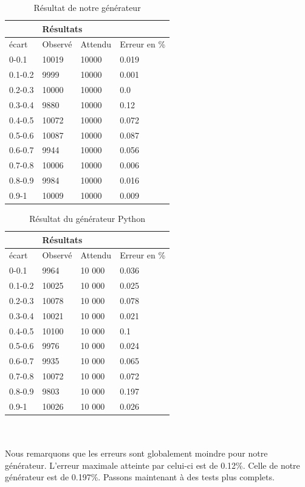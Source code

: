 \documentclass[french]{article}
\begin{document}
\begin{table}[]
\centering
\caption{Résultat de notre générateur }

\begin{tabular}{|l|l|l|l|}
\hline
        & \multicolumn{3}{l|}{Résultats}   \\ \hline
écart   & Observé & Attendu & Erreur en \% \\ \hline
0-0.1   & 10019   & 10000   & 0.019        \\ \hline
0.1-0.2 & 9999    & 10000   & 0.001        \\ \hline
0.2-0.3 & 10000   & 10000   & 0.0          \\ \hline
0.3-0.4 & 9880    & 10000   & 0.12         \\ \hline
0.4-0.5 & 10072   & 10000   & 0.072        \\ \hline
0.5-0.6 & 10087   & 10000   & 0.087        \\ \hline
0.6-0.7 & 9944    & 10000   & 0.056        \\ \hline
0.7-0.8 & 10006   & 10000   & 0.006        \\ \hline
0.8-0.9 & 9984    & 10000   & 0.016        \\ \hline
0.9-1   & 10009   & 10000   & 0.009        \\ \hline
\end{tabular}
\end{table}
\begin{table}[]
\centering
\caption{Résultat du générateur Python}

\begin{tabular}{|l|l|l|l|}
\hline
        & \multicolumn{3}{l|}{Résultats}   \\ \hline
écart   & Observé & Attendu & Erreur en \% \\ \hline
0-0.1   & 9964    & 10 000   & 0.036        \\ \hline
0.1-0.2 & 10025   & 10 000   & 0.025        \\ \hline
0.2-0.3 & 10078   & 10 000   & 0.078        \\ \hline
0.3-0.4 & 10021   & 10 000   & 0.021        \\ \hline
0.4-0.5 & 10100   & 10 000   & 0.1          \\ \hline
0.5-0.6 & 9976    & 10 000   & 0.024        \\ \hline
0.6-0.7 & 9935    & 10 000   & 0.065        \\ \hline
0.7-0.8 & 10072   & 10 000   & 0.072        \\ \hline
0.8-0.9 & 9803    & 10 000   & 0.197        \\ \hline
0.9-1   & 10026   & 10 000   & 0.026        \\ \hline
\end{tabular}
\end{table}
\\\\
Nous remarquons que les erreurs sont globalement moindre pour notre générateur. L'erreur maximale atteinte par celui-ci est de 0.12\%. Celle de notre générateur est de 0.197\%.
Passons maintenant à des tests plus complets.
\end{document}

